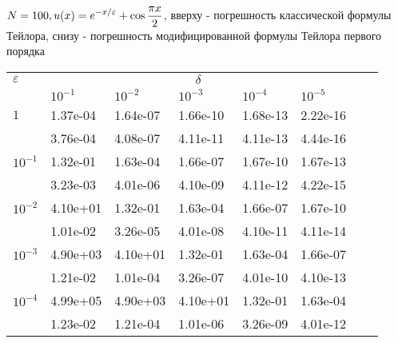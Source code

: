 \documentclass[10pt,twoside]{uz_kgu}
\begin{document}
	\begin{table}[!htb]
	$	{\label {tab:cub23}  N=100, \displaystyle u(x)=e^{-x /\varepsilon}+ \cos \frac{\pi x}{2} }$, вверху - погрешность классической формулы Тейлора, снизу - погрешность модифицированной формулы Тейлора первого порядка
	\begin{center}
		\begin{tabular}{|l|l|l|l|l|l|l|l|}
			\cline{1-6}  $\varepsilon$ & \multicolumn{5}{c|}{$\delta$}  \\
			\cline{2-6} &$10^{-1}$ & $10^{-2}$ & $10^{-3}$  & $10^{-4}$& $10^{-5}$\\
			\cline{1-6}
			$1$
			&1.37e-04 &1.64e-07&1.66e-10&1.68e-13&2.22e-16\\
			&3.76e-04 &4.08e-07 &4.11e-11 &4.11e-13&4.44e-16  \\
			\cline{1-6}
			$10^{-1}$
			&1.32e-01 &1.63e-04&1.66e-07&1.67e-10&1.67e-13\\
			&3.23e-03 &4.01e-06&4.10e-09&4.11e-12 &4.22e-15 \\
			\cline{1-6}
			$10^{-2}$
			&4.10e+01 &1.32e-01&1.63e-04&1.66e-07&1.67e-10\\
			&1.01e-02 &3.26e-05&4.01e-08&4.10e-11&4.11e-14   \\
			\cline{1-6}
			$10^{-3}$
			&4.90e+03&4.10e+01&1.32e-01&1.63e-04&1.66e-07 \\
			&1.21e-02&1.01e-04 &3.26e-07&4.01e-10&4.10e-13 \\
			\cline{1-6}
			$10^{-4}$
			&4.99e+05&4.90e+03 &4.10e+01&1.32e-01&1.63e-04\\
			&1.23e-02&1.21e-04 &1.01e-06&3.26e-09&4.01e-12 \\
			\cline{1-6}
		\end{tabular}
	\end{center}
\end{table}	

		
		
	
\end{document}
